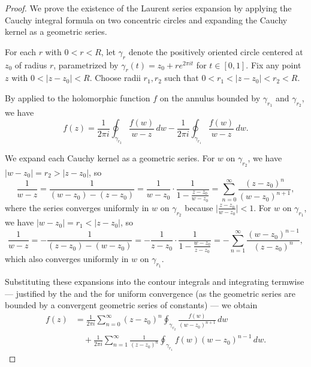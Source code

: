 \begin{proof}
    We prove the existence of the Laurent series expansion by applying the Cauchy integral formula on two concentric circles and expanding the Cauchy kernel as a geometric series.

    For each $r$ with $0 < r < R$, let $\gamma_r$ denote the positively oriented circle centered at $z_0$ of radius $r$, parametrized by $\gamma_r(t) = z_0 + r e^{2\pi i t}$ for $t \in [0,1]$. Fix any point $z$ with $0 < |z - z_0| < R$. Choose radii $r_1, r_2$ such that $0 < r_1 < |z - z_0| < r_2 < R$.

    By  applied to the holomorphic function $f$ on the annulus bounded by $\gamma_{r_1}$ and $\gamma_{r_2}$, we have
    $$f(z) = \frac{1}{2\pi i} \oint_{\gamma_{r_2}} \frac{f(w)}{w - z}\,dw - \frac{1}{2\pi i} \oint_{\gamma_{r_1}} \frac{f(w)}{w - z}\,dw.$$

    We expand each Cauchy kernel as a geometric series. For $w$ on $\gamma_{r_2}$, we have $|w - z_0| = r_2 > |z - z_0|$, so
    $$\frac{1}{w - z} = \frac{1}{(w - z_0) - (z - z_0)} = \frac{1}{w - z_0} \cdot \frac{1}{1 - \frac{z - z_0}{w - z_0}} = \sum_{n=0}^{\infty} \frac{(z - z_0)^n}{(w - z_0)^{n+1}},$$
    where the series converges uniformly in $w$ on $\gamma_{r_2}$ because $\bigl|\frac{z - z_0}{w - z_0}\bigr| < 1$. For $w$ on $\gamma_{r_1}$, we have $|w - z_0| = r_1 < |z - z_0|$, so
    $$\frac{1}{w - z} = -\frac{1}{(z - z_0) - (w - z_0)} = -\frac{1}{z - z_0} \cdot \frac{1}{1 - \frac{w - z_0}{z - z_0}} = -\sum_{n=1}^{\infty} \frac{(w - z_0)^{n-1}}{(z - z_0)^n},$$
    which also converges uniformly in $w$ on $\gamma_{r_1}$.

    Substituting these expansions into the contour integrals and integrating termwise — justified by the  and the  for uniform convergence (as the geometric series are bounded by a convergent geometric series of constants) — we obtain
    \begin{align*}
        f(z) &= \frac{1}{2\pi i} \sum_{n=0}^{\infty} (z - z_0)^n \oint_{\gamma_{r_2}} \frac{f(w)}{(w - z_0)^{n+1}}\,dw \\
        &\quad + \frac{1}{2\pi i} \sum_{n=1}^{\infty} \frac{1}{(z - z_0)^n} \oint_{\gamma_{r_1}} f(w)(w - z_0)^{n-1}\,dw.
    \end{align*}


\end{proof}
